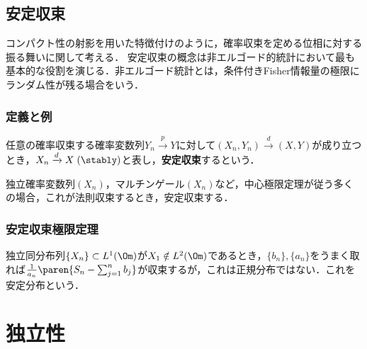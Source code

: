 \documentclass[uplatex,dvipdfmx]{jsreport}
\begin{document}
\section{安定収束}

\begin{tcolorbox}[colframe=ForestGreen, colback=ForestGreen!10!white,breakable,colbacktitle=ForestGreen!40!white,coltitle=black,fonttitle=\bfseries\sffamily,
title=]
    コンパクト性の射影を用いた特徴付けのように，確率収束を定める位相に対する振る舞いに関して考える．
    安定収束の概念は非エルゴード的統計において最も基本的な役割を演じる．非エルゴード統計とは，条件付きFisher情報量の極限にランダム性が残る場合をいう．
\end{tcolorbox}

\subsection{定義と例}

\begin{definition}
    任意の確率収束する確率変数列$Y_n\xrightarrow{p}Y$に対して$(X_n,Y_n)\xrightarrow{d}(X,Y)$が成り立つとき，$X_n\xrightarrow{d}X\;(\stably)$と表し，\textbf{安定収束}するという．
\end{definition}

\begin{example}
    独立確率変数列$(X_n)$，マルチンゲール$(X_n)$など，中心極限定理が従う多くの場合，これが法則収束するとき，安定収束する．
\end{example}

\subsection{安定収束極限定理}

\begin{tcolorbox}[colframe=ForestGreen, colback=ForestGreen!10!white,breakable,colbacktitle=ForestGreen!40!white,coltitle=black,fonttitle=\bfseries\sffamily,
title=]
    独立同分布列$\{X_n\}\subset L^1(\Om)$が$X_1\notin L^2(\Om)$であるとき，$\{b_n\},\{a_n\}$をうまく取れば$\frac{1}{a_n}\paren{S_n-\sum_{j=1}^nb_j}$が収束するが，これは正規分布ではない．これを安定分布という．
\end{tcolorbox}

\chapter{独立性}
\end{document}

